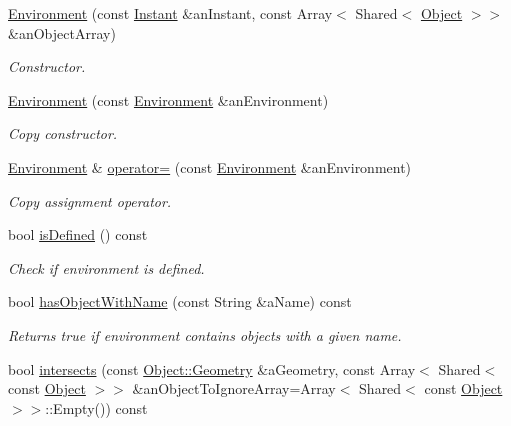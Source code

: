 \begin{DoxyCompactItemize}
\item 
\hyperlink{classlibrary_1_1physics_1_1_environment_a51854f130c31eb075ea623e332978495}{Environment} (const \hyperlink{classlibrary_1_1physics_1_1time_1_1_instant}{Instant} \&an\+Instant, const Array$<$ Shared$<$ \hyperlink{classlibrary_1_1physics_1_1env_1_1_object}{Object} $>$$>$ \&an\+Object\+Array)
\begin{DoxyCompactList}\small\item\em Constructor. \end{DoxyCompactList}\item 
\hyperlink{classlibrary_1_1physics_1_1_environment_afb2fe03dcd7061a8ed5e155d7d134ba2}{Environment} (const \hyperlink{classlibrary_1_1physics_1_1_environment}{Environment} \&an\+Environment)
\begin{DoxyCompactList}\small\item\em Copy constructor. \end{DoxyCompactList}\item 
\hyperlink{classlibrary_1_1physics_1_1_environment}{Environment} \& \hyperlink{classlibrary_1_1physics_1_1_environment_a3410b331642161ad087d76b7d5019a86}{operator=} (const \hyperlink{classlibrary_1_1physics_1_1_environment}{Environment} \&an\+Environment)
\begin{DoxyCompactList}\small\item\em Copy assignment operator. \end{DoxyCompactList}\item 
bool \hyperlink{classlibrary_1_1physics_1_1_environment_acbe2e199328ec6a3d2c233dbe8eb6359}{is\+Defined} () const
\begin{DoxyCompactList}\small\item\em Check if environment is defined. \end{DoxyCompactList}\item 
bool \hyperlink{classlibrary_1_1physics_1_1_environment_ab88060948d60e3775d3c48047e1565aa}{has\+Object\+With\+Name} (const String \&a\+Name) const
\begin{DoxyCompactList}\small\item\em Returns true if environment contains objects with a given name. \end{DoxyCompactList}\item 
bool \hyperlink{classlibrary_1_1physics_1_1_environment_ad3dec84407f2d3d91efc833a563f11c9}{intersects} (const \hyperlink{classlibrary_1_1physics_1_1env_1_1_object_abdf50733c7ad97327fb64edca5670f13}{Object\+::\+Geometry} \&a\+Geometry, const Array$<$ Shared$<$ const \hyperlink{classlibrary_1_1physics_1_1env_1_1_object}{Object} $>$$>$ \&an\+Object\+To\+Ignore\+Array=Array$<$ Shared$<$ const \hyperlink{classlibrary_1_1physics_1_1env_1_1_object}{Object} $>$$>$\+::Empty()) const
$$
\end{DoxyCompactItemize}
